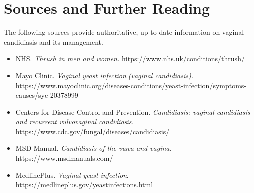 \section*{Sources and Further Reading}
The following sources provide authoritative, up-to-date information on vaginal candidiasis and its management.
\begin{itemize}
    \item NHS. \textit{Thrush in men and women.} https://www.nhs.uk/conditions/thrush/
    \item Mayo Clinic. \textit{Vaginal yeast infection (vaginal candidiasis).} https://www.mayoclinic.org/diseases-conditions/yeast-infection/symptoms-causes/syc-20378999
    \item Centers for Disease Control and Prevention. \textit{Candidiasis: vaginal candidiasis and recurrent vulvovaginal candidiasis.} https://www.cdc.gov/fungal/diseases/candidiasis/
    \item MSD Manual. \textit{Candidiasis of the vulva and vagina.} https://www.msdmanuals.com/
    \item MedlinePlus. \textit{Vaginal yeast infection.} https://medlineplus.gov/yeastinfections.html
\end{itemize}
